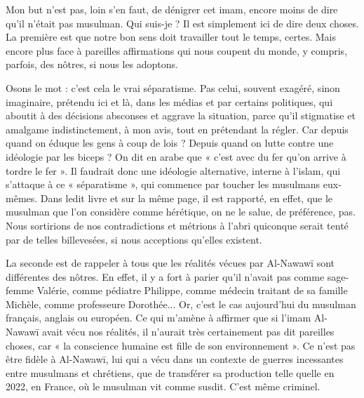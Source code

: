 Mon but n’est pas, loin s’en faut, de dénigrer cet imam, encore moins de dire qu’il n’était pas musulman. Qui suis-je ? Il est simplement ici de dire deux choses. La première est que notre bon sens doit travailler tout le temps, certes. Mais encore plus face à pareilles affirmations qui nous coupent du monde, y compris, parfois, des nôtres, si nous les adoptons.

Osons le mot : c’est cela le vrai séparatisme. Pas celui, souvent exagéré, sinon imaginaire, prétendu ici et là, dans les médias et par certains politiques, qui aboutit à des décisions absconses et aggrave la situation, parce qu’il stigmatise et amalgame indistinctement, à mon avis, tout en prétendant la régler. Car depuis quand on éduque les gens à coup de lois ? Depuis quand on lutte contre une idéologie par les biceps ? On dit en arabe que « c’est avec du fer qu’on arrive à tordre le fer ». Il faudrait donc une idéologie alternative, interne à l’islam, qui s’attaque à ce « séparatisme », qui commence par toucher les musulmans eux-mêmes. Dans ledit livre et sur la même page, il est rapporté, en effet, que le musulman que l’on considère comme hérétique, on ne le salue, de préférence, pas. Nous sortirions de nos contradictions et métrions à l’abri quiconque serait tenté par de telles billevesées, si nous acceptions qu’elles existent.

La seconde est de rappeler à tous que les réalités vécues par Al-Nawawī sont différentes des nôtres. En effet, il y a fort à parier qu’il n’avait pas comme sage-femme Valérie, comme pédiatre Philippe, comme médecin traitant de sa famille Michèle, comme professeure Dorothée... Or, c’est le cas aujourd’hui du musulman français, anglais ou européen. Ce qui m’amène à affirmer que si l’imam Al-Nawawī avait vécu nos réalités, il n’aurait très certainement pas dit pareilles choses, car « la conscience humaine est fille de son environnement ». Ce n’est pas être fidèle à Al-Nawawī, lui qui a vécu dans un contexte de guerres incessantes entre musulmans et chrétiens, que de transférer sa production telle quelle en 2022, en France, où le musulman vit comme susdit. C’est même criminel.